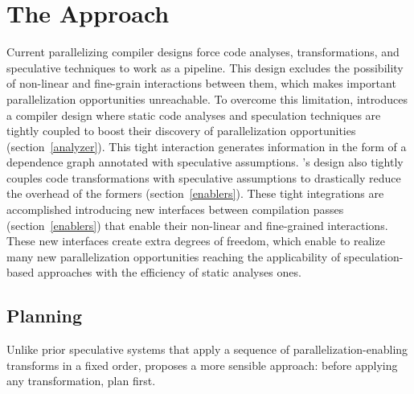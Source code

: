 \section{The \name Approach}
\label{sec:approach}

Current parallelizing compiler designs force code analyses, transformations, and speculative techniques to work as a pipeline.
This design excludes the possibility of non-linear and fine-grain interactions between them, which makes important parallelization opportunities unreachable.
To overcome this limitation, \name introduces a compiler design where static code analyses and speculation techniques are tightly coupled to boost their discovery of parallelization opportunities (section~\ref{analyzer}).
This tight interaction generates information in the form of a dependence graph annotated with speculative assumptions.
\name's design also tightly couples code transformations with speculative assumptions to drastically reduce the overhead of the formers (section~\ref{enablers}).
These tight integrations are accomplished introducing new interfaces between compilation passes (section~\ref{enablers}) that enable their non-linear and fine-grained interactions.
These new interfaces create extra degrees of freedom, which enable \name to realize many new parallelization opportunities reaching the applicability of speculation-based approaches with the efficiency of static analyses ones.



\subsection{Planning}
%
Unlike prior speculative systems that apply a sequence of
parallelization-enabling transforms in a fixed order, \name proposes a
more sensible approach: before applying any transformation, plan
first.

